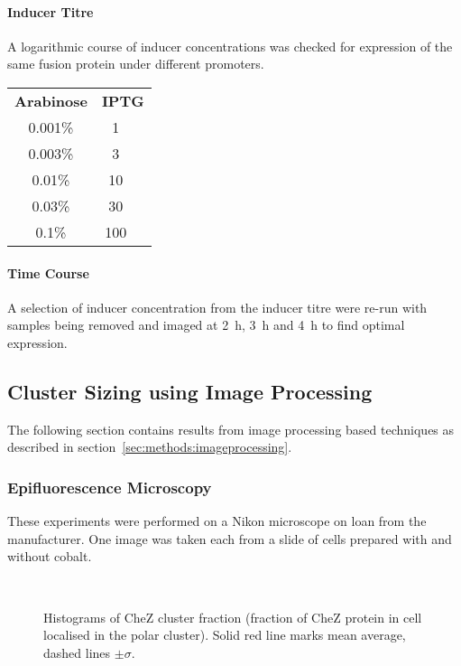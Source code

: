 \documentclass[../main.tex]{subfiles}
\begin{document}
\paragraph{Inducer Titre} A logarithmic course of inducer concentrations was checked for expression of the same fusion protein under different promoters.

\begin{center}
\begin{tabular}{cc}
\textbf{Arabinose}	&	\textbf{IPTG} 	\\
0.001\%	&	\SI{1}{\micro\Molar}\\
0.003\%	&	\SI{3}{\micro\Molar}\\
0.01\%	&	\SI{10}{\micro\Molar}\\
0.03\%	&	\SI{30}{\micro\Molar}\\
0.1\%	&	\SI{100}{\micro\Molar}\\

\end{tabular}
\end{center}

\paragraph{Time Course}	A selection of inducer concentration from the inducer titre were re-run with samples being removed and imaged at \SI{2}{\hour}, \SI{3}{\hour} and \SI{4}{\hour} to find optimal expression.
 

\subsection{Cluster Sizing using Image Processing}

The following section contains results from image processing based techniques as described in section~\ref{sec:methods:imageprocessing}.

\subsubsection{Epifluorescence Microscopy}
\label{sec:results:cs:epi}

These experiments were performed on a Nikon microscope on loan from the manufacturer. One image was taken each from a slide of cells prepared with and without cobalt.

\begin{figure}[h!]
\begin{center}
\\
\caption{Histograms of CheZ cluster fraction (fraction of CheZ protein in cell localised in the polar cluster). Solid red line marks mean average, dashed lines \(\pm\sigma\).}
\label{fig:results:nikon}
\end{center}
\end{figure}
\end{document}
